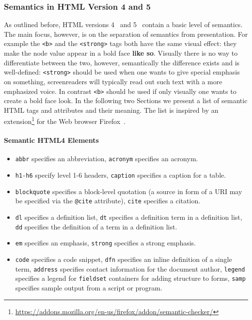 \documentclass[12pt]{article}
\begin{document}
\subsubsection{Semantics in HTML Version 4 and 5}
As outlined before, HTML versions 4~\cite{w3c_html4} and 5~\cite{w3c_html5} contain a basic level of semantics. The main focus, however, is on the separation of semantics from presentation. For example the \texttt{<b>} and the \texttt{<strong>} tags both have the same visual effect: they make the node value appear in a bold face \textbf{like so}. Visually there is no way to differentiate between the two, however, semantically the difference exists and is well-defined: \texttt{<strong>} should be used when one wants to give special emphasis on something, screenreaders will typically read out such text with a more emphasized voice. In contrast \texttt{<b>} should be used if only visually one wants to create a bold face look. In the following two Sections we present a list of semantic HTML tags and attributes and their meaning. The list is inspired by an extension\footnote{\url{https://addons.mozilla.org/en-us/firefox/addon/semantic-checker/}} for the Web browser Firefox~\cite{firefox}.

\paragraph{Semantic HTML4 Elements}
\begin{itemize}
\item \texttt{abbr} specifies an abbreviation, \texttt{acronym} specifies an acronym.
\item \texttt{h1-h6} specify level 1-6 headers, \texttt{caption} specifies a caption for a table.
\item \texttt{blockquote} specifies a block-level quotation (a source in form of a URI may be specified via the \texttt{@cite} attribute), \texttt{cite} specifies a citation.
\item \texttt{dl} specifies a definition list, \texttt{dt} specifies a definition term in a definition list, \texttt{dd} specifies the definition of a term in a definition list.
\item \texttt{em} specifies an emphasis, \texttt{strong} specifies a strong emphasis.
\item \texttt{code} specifies a code snippet, \texttt{dfn} specifies an inline definition of a single term, \texttt{address} specifies contact information for the document author, \texttt{legend} specifies a legend for \texttt{fieldset} containers for adding structure to forms, \texttt{samp} specifies sample output from a script or program.
\end{itemize}
\end{document}
